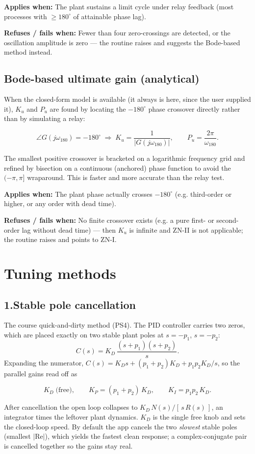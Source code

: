 \documentclass[11pt]{article}
\newcommand{\keybox}[1]{%
  \par\vspace{0.4em}%
  \noindent\colorbox{boxbg}{%
    \begin{minipage}{\dimexpr\linewidth-2\fboxsep\relax}%
      \vspace{0.3em}#1\vspace{0.3em}%
    \end{minipage}}%
  \par\vspace{0.4em}%
}
\newcommand{\applies}[1]{\smallskip\noindent\textbf{Applies when:} #1\par}
\newcommand{\refuses}[1]{\noindent\textbf{Refuses / fails when:} #1\par}
\begin{document}
\applies{The plant sustains a limit cycle under relay feedback (most
processes with $\ge 180^\circ$ of attainable phase lag).}
\refuses{Fewer than four zero-crossings are detected, or the oscillation
amplitude is zero --- the routine raises and suggests the Bode-based method
instead.}

\subsection{Bode-based ultimate gain (analytical)}

When the closed-form model is available (it always is here, since the user
supplied it), $K_u$ and $P_u$ are found by locating the $-180^\circ$ phase
crossover directly rather than by simulating a relay:
\keybox{\[
  \angle G(j\omega_{180}) = -180^\circ
  \;\Longrightarrow\;
  K_u = \frac{1}{\lvert G(j\omega_{180})\rvert}, \qquad
  P_u = \frac{2\pi}{\omega_{180}}.
\]}
The smallest positive crossover is bracketed on a logarithmic frequency grid
and refined by bisection on a continuous (anchored) phase function to avoid
the $(-\pi,\pi]$ wraparound. This is faster and more accurate than the relay
test.

\applies{The plant phase actually crosses $-180^\circ$ (e.g. third-order or
higher, or any order with dead time).}
\refuses{No finite crossover exists (e.g. a pure first- or second-order
lag without dead time) --- then $K_u$ is infinite and ZN-II is not
applicable; the routine raises and points to ZN-I.}

\section{Tuning methods}

\subsection{1.\quad Stable pole cancellation}

The course quick-and-dirty method (PS4). The PID controller carries two zeros,
which are placed exactly on two stable plant poles at $s=-p_1$, $s=-p_2$:
\[
  C(s) = K_D\,\frac{(s+p_1)(s+p_2)}{s}.
\]
Expanding the numerator,
$C(s) = K_D s + (p_1+p_2)K_D + p_1 p_2 K_D / s$, so the parallel gains read off
as
\keybox{\[
  K_D \;\text{(free)}, \qquad
  K_P = (p_1 + p_2)\,K_D, \qquad
  K_I = p_1 p_2\, K_D .
\]}
After cancellation the open loop collapses to $K_D\, N(s)/[\,s\,R(s)\,]$, an
integrator times the leftover plant dynamics. $K_D$ is the single free knob
and sets the closed-loop speed. By default the app cancels the two
\emph{slowest} stable poles (smallest $\lvert\mathrm{Re}\rvert$), which yields
the fastest clean response; a complex-conjugate pair is cancelled together so
the gains stay real.
\end{document}
